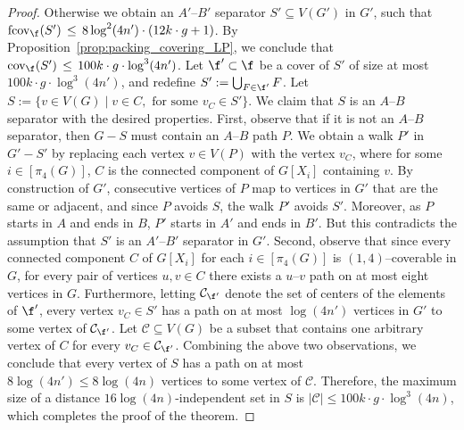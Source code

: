 \begin{proof}
    Otherwise we obtain an $A'$--$B'$ separator $S'\subseteq V(G')$ in $G'$, such that $\mathrm{fcov}_{\f}(S')\, \leq\, 8 \log^2 (4n') \cdot (12k\cdot g + 1)$. By Proposition~\ref{prop:packing_covering_LP}, we conclude that $\mathrm{cov}_{\f}(S')\, \leq\, 100 k \cdot g \cdot \log^3 (4n')$. Let $\f'\subset \f$ be a cover of $S'$ of size at most $100 k \cdot g \cdot \log^3 (4n')$, and redefine $S' := \bigcup_{F\in\f'} F$. Let $S := \{v\in V(G) \mid v\in C,\text{ for some } v_{C}\in S'\}$. We claim that $S$ is an $A$--$B$ separator with the desired properties.
    First, observe that if it is not an $A$--$B$ separator, then $G-S$ must contain an $A$--$B$ path $P$. We obtain a walk $P'$ in $G'-S'$ by replacing each vertex $v \in V(P)$ with the vertex $v_{C}$, where for some $i\in[\pi_4(G)]$, $C$ is the connected component of $G[X_i]$ containing $v$. By construction of $G'$, consecutive vertices of $P$ map to vertices in $G'$ that are the same or adjacent, and since $P$ avoids $S$, the walk $P'$ avoids $S'$. Moreover, as $P$ starts in $A$ and ends in $B$, $P'$ starts in $A'$ and ends in $B'$. But this contradicts the assumption that $S'$ is an $A'$--$B'$ separator in $G'$. 
    Second, observe that since every connected component $C$ of $G[X_i]$ for each $i \in [\pi_4(G)]$ is $(1,4)$--coverable in $G$, for every pair of vertices $u,v \in C$ there exists a $u$--$v$ path on at most eight vertices in $G$. Furthermore, letting $\mathcal{C}_{\f'}$ denote the set of centers of the elements of $\f'$, every vertex $v_C \in S'$ has a path on at most $\log (4n')$ vertices in $G'$ to some vertex of $\mathcal{C}_{\f'}$. Let $\mathcal{C}\subseteq V(G)$ be a subset that contains one arbitrary vertex of $C$ for every $v_C\in\mathcal{C}_{\f'}$. Combining the above two observations, we conclude that every vertex of $S$ has a path on at most $8\log (4n') \leq 8\log (4n)$ vertices to some vertex of $\mathcal{C}$. Therefore, the maximum size of a distance $16\log (4n)$-independent set in $S$ is $|\mathcal{C}| \leq 100 k \cdot g \cdot \log^3 (4n)$, which completes the proof of the theorem. 
\end{proof} 




 


